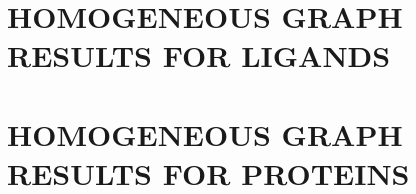 \chapter{HOMOGENEOUS GRAPH RESULTS FOR LIGANDS}
\label{app:homogeneous_ligand}





\chapter{HOMOGENEOUS GRAPH RESULTS FOR PROTEINS}
\label{app:homogeneous_protein}



